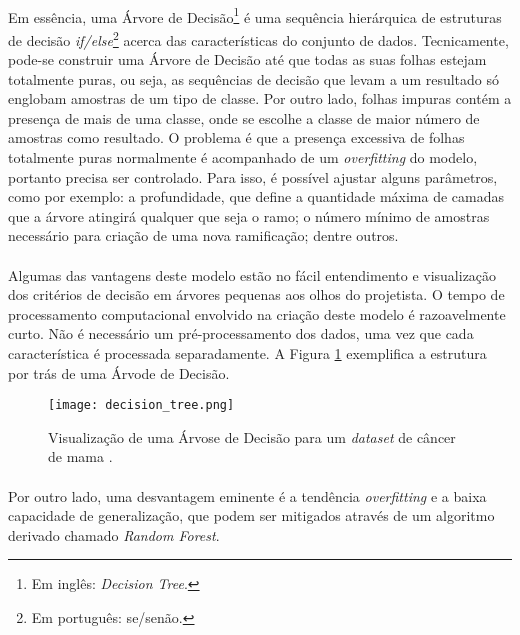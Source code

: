 \paragraph{} Em essência, uma Árvore de Decisão\footnote{Em inglês: \textit{Decision Tree}.} é uma sequência hierárquica de estruturas de decisão \textit{if/else}\footnote{Em português: se/senão.} acerca das características do conjunto de dados. Tecnicamente, pode-se construir uma Árvore de Decisão até que todas as suas folhas estejam totalmente puras, ou seja, as sequências de decisão que levam a um resultado só englobam amostras de um tipo de classe. Por outro lado, folhas impuras contém a presença de mais de uma classe, onde se escolhe a classe de maior número de amostras como resultado. O problema é que a presença excessiva de folhas totalmente puras normalmente é acompanhado de um \textit{overfitting} do modelo, portanto precisa ser controlado. Para isso, é possível ajustar alguns parâmetros, como por exemplo: a profundidade, que define a quantidade máxima de camadas que a árvore atingirá qualquer que seja o ramo; o número mínimo de amostras necessário para criação de uma nova ramificação; dentre outros.

\paragraph{} Algumas das vantagens deste modelo estão no fácil entendimento e visualização dos critérios de decisão em árvores pequenas aos olhos do projetista. O tempo de processamento computacional envolvido na criação deste modelo é razoavelmente curto. Não é necessário um pré-processamento dos dados, uma vez que cada característica é processada separadamente. A Figura \ref{fig:9} exemplifica a estrutura por trás de uma Árvode de Decisão.

\begin{figure}[h]
    \texttt{[image: decision\_tree.png]}
    \centering
    \caption{Visualização de uma Árvose de Decisão para um \textit{dataset} de câncer de mama \cite{muller2016introduction}.}
    \label{fig:9}
\end{figure}

\paragraph{} Por outro lado, uma desvantagem eminente é a tendência \textit{overfitting} e a baixa capacidade de generalização, que podem ser mitigados através de um algoritmo derivado chamado \textit{Random Forest}.


